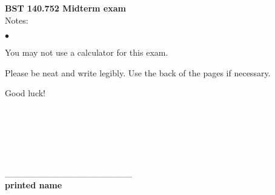 \documentclass[12pt]{article}
\begin{document}
\noindent
{\bf BST 140.752 Midterm exam} \\
Notes:
\begin{list}{$\bullet$}{}
\item You may not use a calculator for this exam.
\item Please be neat and write legibly. Use the back of the pages if necessary.
\item Good luck!
\end{list}
\ \\ \ \\ \ \\ \ \\ \ \\
 \_\_\_\_\_\_\_\_\_\_\_\_\_\_\_\_\_\_\_\_ \\
{\bf printed name}

\newpage
\end{document}

